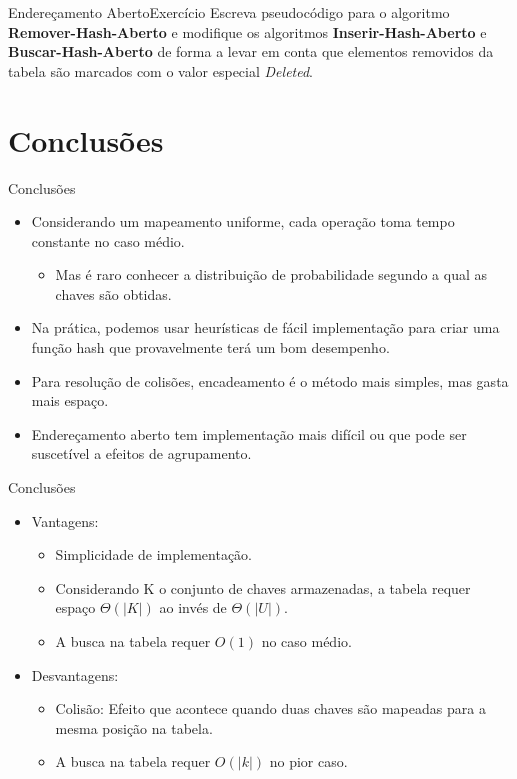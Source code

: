 \documentclass[aspectratio=169]{beamer}
\begin{document}
\begin{frame}{{Endereçamento Aberto}}{Exercício}
Escreva pseudocódigo para o algoritmo {\bf Remover-Hash-Aberto} e modifique os algoritmos {\bf Inserir-Hash-Aberto} e {\bf Buscar-Hash-Aberto} de forma a levar em conta que elementos removidos da tabela são marcados com o valor especial {\it Deleted}.
\end{frame}

\section{Conclusões}

\begin{frame}{Conclusões}
\begin{itemize}
 \item Considerando um mapeamento uniforme, cada operação toma tempo constante no caso médio. 
 \begin{itemize}
 \item Mas é raro conhecer a distribuição de probabilidade segundo a qual as chaves são obtidas.
 \end{itemize}
\item Na prática, podemos usar heurísticas de fácil implementação para criar uma função hash que provavelmente terá um bom desempenho.
\item Para resolução de colisões, encadeamento é o método mais simples, mas gasta mais espaço.
\item Endereçamento aberto tem implementação mais difícil ou que pode ser suscetível a efeitos de agrupamento.
\end{itemize}
\end{frame}

\begin{frame}{Conclusões}
\begin{itemize}
 \item Vantagens:
 \begin{itemize}
	\item Simplicidade de implementação. 
	\item Considerando K o conjunto de chaves armazenadas, a tabela requer espaço $\Theta(|K|)$ ao invés de $\Theta(|U|)$.
	\item A busca na tabela requer $O(1)$ no caso médio.
 \end{itemize}
 \item Desvantagens:
 \begin{itemize}
\item Colisão: Efeito que acontece quando duas chaves são mapeadas para a mesma posição na tabela. 
\item A busca na tabela requer $O(|k|)$ no pior caso.
 \end{itemize}
\end{itemize}
\end{frame}
\end{document}
